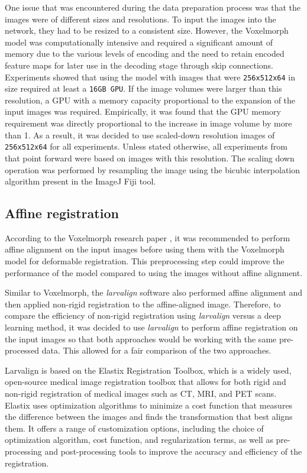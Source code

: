 \documentclass{report}
\begin{document}
	One issue that was encountered during the data preparation process was that the images were of different sizes and resolutions. To input the images into the network, they had to be resized to a consistent size. However, the Voxelmorph model was computationally intensive and required a significant amount of memory due to the various levels of encoding and the need to retain encoded feature maps for later use in the decoding stage through skip connections. Experiments showed that using the model with images that were \texttt{256x512x64} in size required at least a \texttt{16GB GPU}. If the image volumes were larger than this resolution, a GPU with a memory capacity proportional to the expansion of the input images was required. Empirically, it was found that the GPU memory requirement was directly proportional to the increase in image volume by more than 1. As a result, it was decided to use scaled-down resolution images of \texttt{256x512x64} for all experiments. Unless stated otherwise, all experiments from that point forward were based on images with this resolution. The scaling down operation was performed by resampling the image using the bicubic interpolation algorithm present in the ImageJ Fiji tool.
	
	\subsection{Affine registration}
	According to the Voxelmorph research paper \cite{Balakrishnan_2019}, it was recommended to perform affine alignment on the input images before using them with the Voxelmorph model for deformable registration. This preprocessing step could improve the performance of the model compared to using the images without affine alignment.
	
	Similar to Voxelmorph, the \textit{larvalign} software \cite{larvalign} also performed affine alignment and then applied non-rigid registration to the affine-aligned image. Therefore, to compare the efficiency of non-rigid registration using \textit{larvalign} versus a deep learning method, it was decided to use \textit{larvalign} to perform affine registration on the input images so that both approaches would be working with the same pre-processed data. This allowed for a fair comparison of the two approaches.
	
	\begin{tcolorbox}[colback=rwth-blue-5,colframe=rwth-blue-1,title=\textbf{Larvalign Software}]
		Larvalign is based on the Elastix Registration Toolbox, which is a widely used, open-source medical image registration toolbox that allows for both rigid and non-rigid registration of medical images such as CT, MRI, and PET scans.
		\tcblower
		Elastix uses optimization algorithms to minimize a cost function that measures the difference between the images and finds the transformation that best aligns them. It offers a range of customization options, including the choice of optimization algorithm, cost function, and regularization terms, as well as pre-processing and post-processing tools to improve the accuracy and efficiency of the registration.
	\end{tcolorbox}
	
\end{document}
